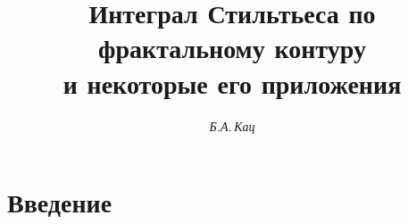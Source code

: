 




% 





\newcommand{\tts}[1]{}







\setcounter{page}{21}















\author{\it Б.А.\,Кац}




\title{Интеграл Стильтьеса по фрактальному контуру\\


и некоторые его приложения}





\date{}




\pagestyle{plain} %







\maketitle


\label{begin}





\section{Введение}





